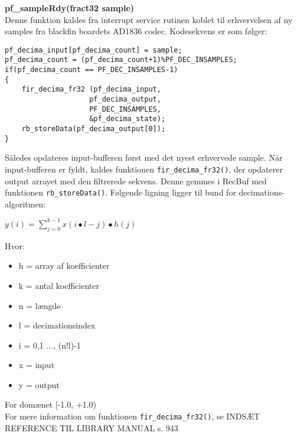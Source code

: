 \textbf{pf\_sampleRdy(fract32 sample)} \\
Denne funktion kaldes fra interrupt service rutinen koblet til erhvervelsen af ny samples fra blackfin boardets  AD1836 codec. Kodesekvens er som følger:
\begin{verbatim}
pf_decima_input[pf_decima_count] = sample;
pf_decima_count = (pf_decima_count+1)%PF_DEC_INSAMPLES;
if(pf_decima_count == PF_DEC_INSAMPLES-1)
{
	fir_decima_fr32 (pf_decima_input,
	                pf_decima_output,
	                PF_DEC_INSAMPLES,
	                &pf_decima_state);
	rb_storeData(pf_decima_output[0]);
}
\end{verbatim}
Således opdateres input-bufferen først med det nyest erhvervede sample. Når input-bufferen er fyldt, kaldes funktionen \verb+fir_decima_fr32()+, der opdaterer output arrayet med den filtrerede sekvens. Denne gemmes i RecBuf med funktionen \verb+rb_storeData()+.
Følgende ligning ligger til bund for decimations-algoritmen:
\begin{center}
$y\left( i \right) =\sum _{ j=0 }^{ k-1 }{ x\left( i\bullet l-j \right) \bullet h\left( j \right)  } $
\end{center}
Hvor:
\begin{itemize}
	\item h = array af koefficienter
	\item k = antal koefficienter
	\item n = længde
	\item l = decimationsindex
	\item i = {0,1 ..., (n!l)-1}
	\item x = input
	\item y = output
\end{itemize}
For domænet [-1.0, +1.0) \\
For mere information om funktionen \verb+fir_decima_fr32()+, se INDSÆT REFERENCE TIL LIBRARY MANUAL s. 943
